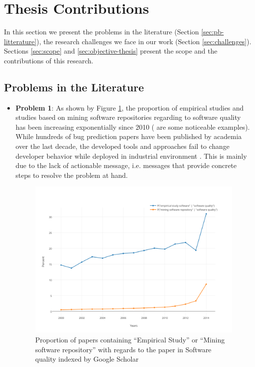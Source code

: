 \section{Thesis Contributions}


In this section we present the problems in the literature (Section \ref{sec:pb-litterature}), the research challenges we face in our work (Section \ref{sec:challenges}). Sections \ref{sec:scope} and \ref{sec:objective-thesis} present the scope and the contributions of this research.

\subsection{Problems in the Literature\label{sec:pb-litterature}}

\begin{itemize}
	\item {\bf Problem 1}: As shown by Figure \ref{fig:scholar}, the proportion of empirical studies and studies based on mining software repositories regarding to software quality has been increasing exponentially since 2010 (\cite{Kim2011a,Lee2011a,Sun2011,Bhattacharya2011,Tian2012a,Zimmermann2012, Shang2013, Chen2014, McIntosh, Hemmati2015} are some noticeable examples).
	While hundreds of bug prediction papers have been published by academia over the last decade, the developed tools and approaches fail to change developer behavior while deployed in industrial environment	\cite{Lewis2013}.
	This is mainly due to the lack of actionable message, i.e. messages that provide concrete steps to resolve the problem at hand.

	\begin{figure}[h!]
	  \centering
	  	    \includegraphics[scale=0.7]{media/scholar.png}
	    \caption{Proportion of papers containing ``Empirical Study'' or ``Mining software repository'' with regards to the paper in Software quality indexed by Google Scholar	\label{fig:scholar}}
	\end{figure}


\end{itemize}
